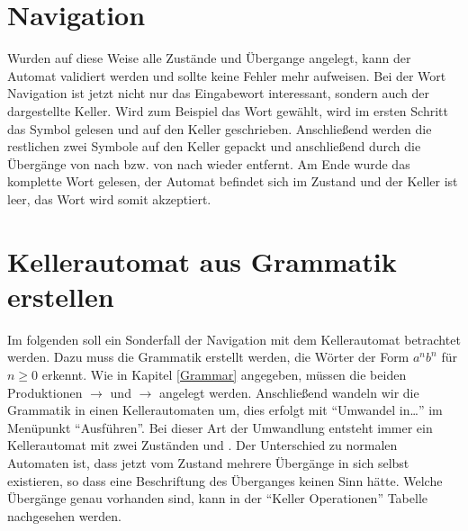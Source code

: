 \section{Navigation}

Wurden auf diese Weise alle Zustände und Übergange angelegt, kann der Automat
validiert werden und sollte keine Fehler mehr aufweisen. Bei der Wort
Navigation ist jetzt nicht nur das Eingabewort interessant, sondern auch der
dargestellte Keller. Wird zum Beispiel das Wort  gewählt, wird im
ersten Schritt das Symbol  gelesen und auf den Keller geschrieben.
Anschließend werden die restlichen zwei Symbole  auf den Keller
gepackt und anschließend durch die Übergänge von  nach 
bzw. von  nach  wieder entfernt. Am Ende wurde das
komplette Wort  gelesen, der Automat befindet sich im Zustand
 und der Keller ist leer, das Wort wird somit akzeptiert.


\section{Kellerautomat aus Grammatik erstellen}

Im folgenden soll ein Sonderfall der Navigation mit dem Kellerautomat betrachtet
werden. Dazu muss die Grammatik erstellt werden, die Wörter der Form $a^n b^n$
für $n \geq 0$ erkennt. Wie in Kapitel \ref{Grammar} angegeben, müssen die beiden
Produktionen  $\to$ \TerminalSymbol{$\epsilon$} und
 $\to$ 
angelegt werden. Anschließend wandeln wir die Grammatik in einen
Kellerautomaten um, dies erfolgt mit "`Umwandel in\ldots"' im Menüpunkt
"`Ausführen"'. Bei dieser Art der Umwandlung entsteht immer ein Kellerautomat
mit zwei Zuständen  und . Der Unterschied zu normalen
Automaten ist, dass jetzt vom Zustand  mehrere Übergänge in sich
selbst existieren, so dass eine Beschriftung des Überganges keinen Sinn hätte.
Welche Übergänge genau vorhanden sind, kann in der "`Keller Operationen"'
Tabelle nachgesehen werden.\vspace{10pt}

